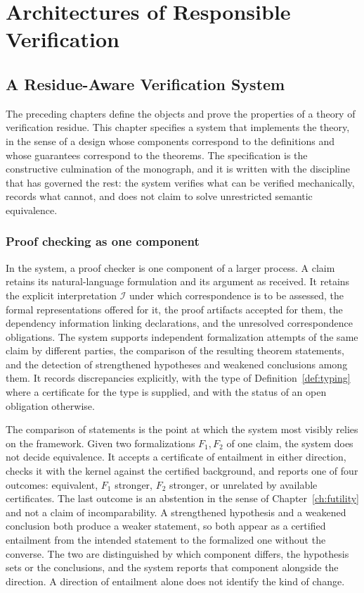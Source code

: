 \part{Architectures of Responsible Verification}

\chapter{A Residue-Aware Verification System}
\label{ch:system}

The preceding chapters define the objects and prove the properties of a theory of verification residue. This chapter specifies a system that implements the theory, in the sense of a design whose components correspond to the definitions and whose guarantees correspond to the theorems. The specification is the constructive culmination of the monograph, and it is written with the discipline that has governed the rest: the system verifies what can be verified mechanically, records what cannot, and does not claim to solve unrestricted semantic equivalence.

\section{Proof checking as one component}

In the system, a proof checker is one component of a larger process. A claim retains its natural-language formulation and its argument as received. It retains the explicit interpretation $\mathcal{I}$ under which correspondence is to be assessed, the formal representations offered for it, the proof artifacts accepted for them, the dependency information linking declarations, and the unresolved correspondence obligations. The system supports independent formalization attempts of the same claim by different parties, the comparison of the resulting theorem statements, and the detection of strengthened hypotheses and weakened conclusions among them. It records discrepancies explicitly, with the type of Definition~\ref{def:typing} where a certificate for the type is supplied, and with the status of an open obligation otherwise.

The comparison of statements is the point at which the system most visibly relies on the framework. Given two formalizations $F_1, F_2$ of one claim, the system does not decide equivalence. It accepts a certificate of entailment in either direction, checks it with the kernel against the certified background, and reports one of four outcomes: equivalent, $F_1$ stronger, $F_2$ stronger, or unrelated by available certificates. The last outcome is an abstention in the sense of Chapter~\ref{ch:futility} and not a claim of incomparability. A strengthened hypothesis and a weakened conclusion both produce a weaker statement, so both appear as a certified entailment from the intended statement to the formalized one without the converse. The two are distinguished by which component differs, the hypothesis sets or the conclusions, and the system reports that component alongside the direction. A direction of entailment alone does not identify the kind of change.

